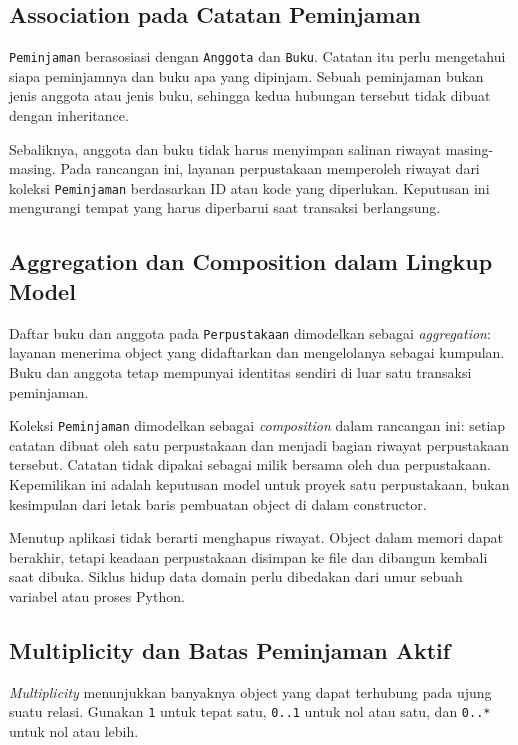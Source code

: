 \subsection{Association pada Catatan Peminjaman}

\texttt{Peminjaman} berasosiasi dengan \texttt{Anggota} dan \texttt{Buku}. Catatan itu perlu mengetahui siapa peminjamnya dan buku apa yang dipinjam. Sebuah peminjaman bukan jenis anggota atau jenis buku, sehingga kedua hubungan tersebut tidak dibuat dengan inheritance.

Sebaliknya, anggota dan buku tidak harus menyimpan salinan riwayat masing-masing. Pada rancangan ini, layanan perpustakaan memperoleh riwayat dari koleksi \texttt{Peminjaman} berdasarkan ID atau kode yang diperlukan. Keputusan ini mengurangi tempat yang harus diperbarui saat transaksi berlangsung.

\subsection{Aggregation dan Composition dalam Lingkup Model}

Daftar buku dan anggota pada \texttt{Perpustakaan} dimodelkan sebagai \emph{aggregation}: layanan menerima object yang didaftarkan dan mengelolanya sebagai kumpulan. Buku dan anggota tetap mempunyai identitas sendiri di luar satu transaksi peminjaman.

Koleksi \texttt{Peminjaman} dimodelkan sebagai \emph{composition} dalam rancangan ini: setiap catatan dibuat oleh satu perpustakaan dan menjadi bagian riwayat perpustakaan tersebut. Catatan tidak dipakai sebagai milik bersama oleh dua perpustakaan. Kepemilikan ini adalah keputusan model untuk proyek satu perpustakaan, bukan kesimpulan dari letak baris pembuatan object di dalam constructor.

Menutup aplikasi tidak berarti menghapus riwayat. Object dalam memori dapat berakhir, tetapi keadaan perpustakaan disimpan ke file dan dibangun kembali saat dibuka. Siklus hidup data domain perlu dibedakan dari umur sebuah variabel atau proses Python.

\subsection{Multiplicity dan Batas Peminjaman Aktif}

\emph{Multiplicity} menunjukkan banyaknya object yang dapat terhubung pada ujung suatu relasi. Gunakan \texttt{1} untuk tepat satu, \texttt{0..1} untuk nol atau satu, dan \texttt{0..*} untuk nol atau lebih.

